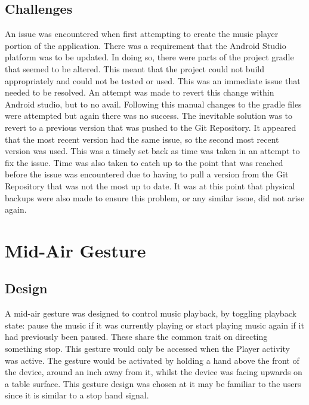 \documentclass{l4proj}
\begin{document}
\subsection{Challenges}
An issue was encountered when first attempting to create the music player portion of the application. There was a requirement that the Android Studio platform was to be updated. In doing so, there were parts of the project gradle that seemed to be altered. This meant that the project could not build appropriately and could not be tested or used. This was an immediate issue that needed to be resolved. An attempt was made to revert this change within Android studio, but to no avail. Following this manual changes to the gradle files were attempted but again there was no success. The inevitable solution was to revert to a previous version that was pushed to the Git Repository. It appeared that the most recent version had the same issue, so the second most recent version was used. This was a timely set back as time was taken in an attempt to fix the issue. Time was also taken to catch up to the point that was reached before the issue was encountered due to having to pull a version from the Git Repository that was not the most up to date. It was at this point that physical backups were also made to ensure this problem, or any similar issue, did not arise again.

\section{Mid-Air Gesture}

\subsection{Design}
A mid-air gesture was designed to control music playback, by toggling playback state: pause the music if it was currently playing or start playing music again if it had previously been paused. These share the common trait on directing something stop. This gesture would only be accessed when the Player activity was active. The gesture would be activated by holding a hand above the front of the device, around an inch away from it, whilst the device was facing upwards on a table surface. This gesture design was chosen at it may be familiar to the users since it is similar to a stop hand signal. 
\end{document}
